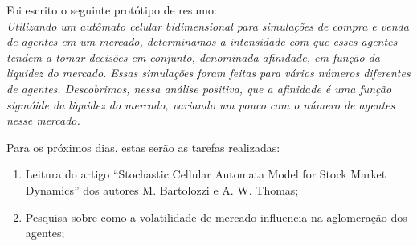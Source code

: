 \documentclass[12pt,a4paper,final]{article}
\begin{document}
  Foi escrito o seguinte protótipo de resumo:\\
  \textit{Utilizando um autômato celular bidimensional para simulações de compra e venda de agentes em um mercado, determinamos a intensidade com que esses agentes tendem a tomar decisões em conjunto, denominada afinidade, em função da liquidez do mercado. Essas simulações foram feitas para vários números diferentes de agentes. Descobrimos, nessa análise positiva, que a afinidade é uma função sigmóide da liquidez do mercado, variando um pouco com o número de agentes nesse mercado.}

  Para os próximos dias, estas serão as tarefas realizadas:
	\begin{enumerate}
		\item Leitura do artigo ``Stochastic Cellular Automata Model for Stock Market Dynamics'' dos autores M. Bartolozzi e A. W. Thomas;
		\item Pesquisa sobre como a volatilidade de mercado influencia na aglomeração dos agentes;
	\end{enumerate}
\end{document}
